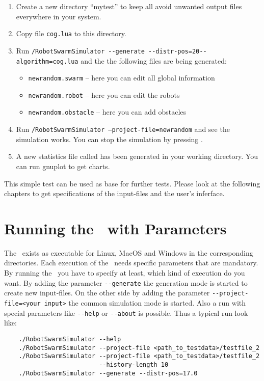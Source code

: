 \documentclass[a4paper,halfparskip,11pt,twoside]{scrartcl}
\begin{document}
\begin{enumerate}
	\item Create a new directory ``mytest'' to keep all avoid unwanted output files everywhere in your system.
	\item Copy file {\tt cog.lua} to this directory.
	\item Run {\tt <path to RSS>/RobotSwarmSimulator -{}-generate -{}-distr-pos=20\newline -{}-algorithm=cog.lua} and the the following files are being generated:
	\begin{itemize}
		\item {\tt newrandom.swarm} -- here you can edit all global information
		\item {\tt newrandom.robot} -- here you can edit the robots
		\item {\tt newrandom.obstacle} -- here you can add obstacles
	\end{itemize}
	\item Run {\tt <path to RSS>/RobotSwarmSimulator --project-file=newrandom} and see the simulation works. You can stop the simulation by pressing .
	\item A new statistics file called  has been generated in your working directory. You can run gnuplot to get charts.
\end{enumerate}
This simple test can be used as base for further tests. Please look at the following chapters to get specifications of the input-files and the user's inferface.

\section{Running the \RSS\ with Parameters}

The \RSS\ exists as executable for Linux, MacOS and Windows in the corresponding directories. Each execution of the \RSS\ needs specific parameters that are mandatory. By running the \RSS\ you have to specify at least, which kind of execution do you want. By adding the parameter {\tt -{}-generate} the generation mode is started to create new input-files. On the other side by adding the parameter {\tt -{}-project-file=<your input>} the common simulation mode is started. Also a run with special parameters like {\tt-{}-help} or {\tt-{}-about} is possible. Thus a typical run look like:
\begin{verbatim}
    ./RobotSwarmSimulator --help
    ./RobotSwarmSimulator --project-file <path_to_testdata>/testfile_2
    ./RobotSwarmSimulator --project-file <path_to_testdata>/testfile_2 
                          --history-length 10
    ./RobotSwarmSimulator --generate --distr-pos=17.0
\end{verbatim}
\end{document}
